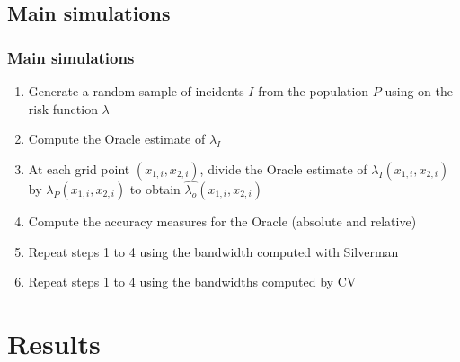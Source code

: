\documentclass[notheorems]{beamer}
\theoremstyle{definition}
\theoremstyle{example}
\begin{document}
\subsection{Main simulations}
\begin{frame}\frametitle{Main simulations}
    \begin{enumerate}
        \item Generate a random sample of incidents $I$ from the population $P$ using on the risk function $\lambda$
        \item Compute the Oracle estimate of $\lambda_I$
        \item At each grid point $(x_{1,i}, x_{2,i})$,
                divide the Oracle estimate of $\lambda_I(x_{1,i}, x_{2,i})$
                by $\lambda_P(x_{1,i}, x_{2,i})$ to obtain $\hat{\lambda_o}(x_{1,i}, x_{2,i})$
        \item Compute the accuracy measures for the Oracle (absolute and relative)
        \item Repeat steps 1 to 4 using the bandwidth computed with Silverman
        \item Repeat steps 1 to 4 using the bandwidths computed by CV
    \end{enumerate}
\end{frame}



\section{Results}

\end{document}
